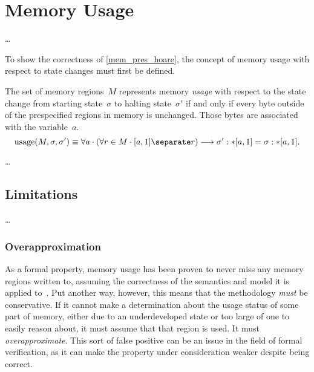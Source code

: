 \chapter{Memory Usage}











\todo\dots

To show the correctness of \cref{mem_pres_hoare},
the concept of memory usage with respect to state changes must first be defined.
\begin{definition}
  The set of memory regions~$M$ represents memory \emph{usage} with respect to
  the state change from starting state~$\sigma$ to halting state~$\sigma'$
  if and only if every byte outside of the prespecified regions in memory is unchanged.
  Those bytes are associated with the variable~$a$.
  \begin{equation}
    \usage(M,\sigma,\sigma')\equiv\forall a\cdot(\forall r\in M\cdot\region{a}1\separate r)
    \longrightarrow\readmemS{\sigma'}a{1}=\readmemS{\sigma}a{1}.
  \end{equation}
\end{definition}
\begin{example}
\end{example}

\todo\dots

\section{Limitations}\label{mem_use_limits}
\todo\dots

\subsection{Overapproximation}\label{mem_use_over}
As a formal property, memory usage has been proven to never miss any memory regions
written to, assuming the correctness of the semantics and model it is applied
to~\citep{bockenek2019preservation,popl2019underreview}.
Put another way, however, this means that the methodology \emph{must} be conservative.
If it cannot make a determination about the usage status of some part of memory,
either due to an underdeveloped state or too large of one to easily reason about,
it must assume that that region is used. It must \emph{overapproximate}.%
This sort of false positive can be an issue in the field of formal verification,
as it can make the property under consideration weaker despite being correct.

